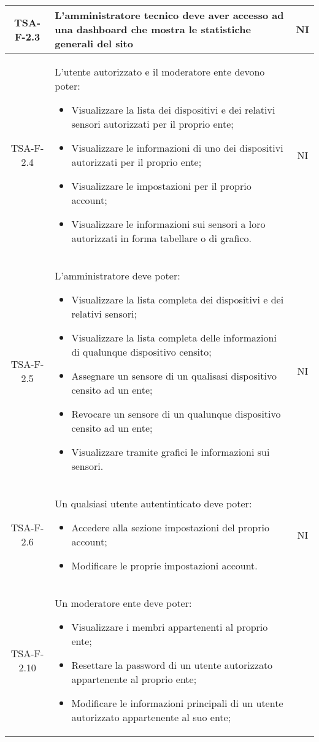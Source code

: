\begin{center}
\begin{longtable}{|c|p{10cm}|c|}
			 \hline
			 TSA-F-2.3 & L'amministratore tecnico deve aver accesso ad una dashboard che mostra le statistiche generali del sito & NI \\
			 \hline
			 TSA-F-2.4 & L'utente autorizzato e il moderatore ente devono poter:
			 \begin{itemize}
			 	\item Visualizzare la lista dei dispositivi e dei relativi sensori autorizzati per il proprio ente;
			 	\item Visualizzare le informazioni di uno dei dispositivi autorizzati per il proprio ente;
			 	\item Visualizzare le impostazioni per il proprio account;
			 	\item Visualizzare le informazioni sui sensori a loro autorizzati in forma tabellare o di grafico.
			 \end{itemize} & NI \\
			 \hline
			 TSA-F-2.5 & L'amministratore deve poter:
			 \begin{itemize}
			 	\item Visualizzare la lista completa dei dispositivi e dei relativi sensori;
			 	\item Visualizzare la lista completa delle informazioni di qualunque dispositivo censito;
			 	\item Assegnare un sensore di un qualisasi dispositivo censito ad un ente;
			 	\item Revocare un sensore di un qualunque dispositivo censito ad un ente;
			 	\item Visualizzare tramite grafici le informazioni sui sensori.
			 \end{itemize} & NI \\
			 \hline
			 TSA-F-2.6 & Un qualsiasi utente autentinticato deve poter:
			 \begin{itemize}
			 	\item Accedere alla sezione impostazioni del proprio account;
			 	\item Modificare le proprie impostazioni account.
			 \end{itemize} & NI \\
			 \hline
			 TSA-F-2.10 & Un moderatore ente deve poter:
			 \begin{itemize}
			 	\item Visualizzare i membri appartenenti al proprio ente;
			 	\item Resettare la password di un utente autorizzato appartenente al proprio ente;
			 	\item Modificare le informazioni principali di un utente autorizzato appartenente al suo ente;

\end{itemize}
\end{longtable}
\end{center}

